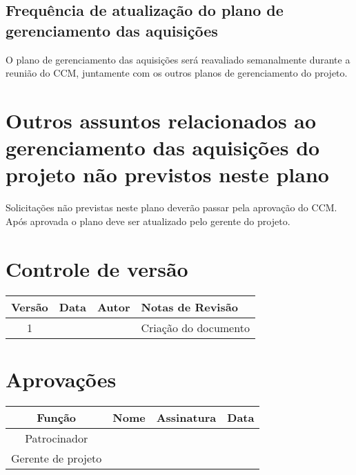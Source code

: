 \subsection{Frequência de atualização do plano de gerenciamento das aquisições}

O plano de gerenciamento das aquisições será reavaliado semanalmente durante a reunião do CCM, juntamente com os outros planos de gerenciamento do projeto.

\section{Outros assuntos relacionados ao gerenciamento das aquisições do projeto não previstos neste plano}

Solicitações não previstas neste plano deverão passar pela aprovação do CCM. Após aprovada o plano deve ser atualizado pelo gerente do projeto.

\section{Controle de versão}

\begin{table}[H]
	\begin{tabularx}{\textwidth}{| c | c | X | X |}
		\hline
		\textbf{Versão} & \textbf{Data} & \textbf{Autor}        & \textbf{Notas de Revisão} \\
		\hline
		1                &               & \projectManagerName{} & Criação do documento     \\
		\hline
	\end{tabularx}
	\centering
\end{table}

\section{Aprovações}

\begin{table}[H]
	\begin{tabularx}{\textwidth}{| c | c | X | c |}
		\hline
		\textbf{Função}  & \textbf{Nome}         & \textbf{Assinatura}        & \textbf{Data} \\
		\hline
		Patrocinador       & \projectSponsorName{} & \projectSponsorSignature{} &               \\
		\hline
		Gerente de projeto & \projectManagerName{} & \projectManagerSignature{} &               \\
		\hline
	\end{tabularx}
	\centering
\end{table}